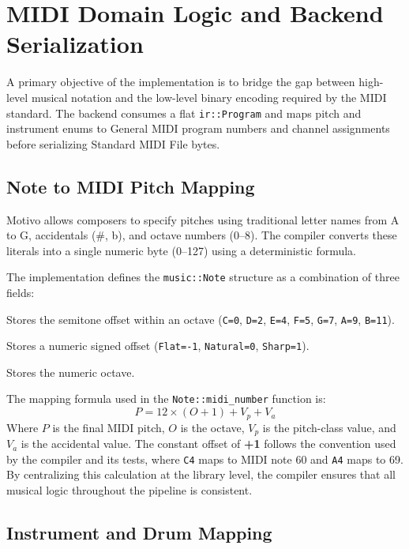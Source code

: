 \section{MIDI Domain Logic and Backend Serialization}\label{sec:midi-backend-design}

A primary objective of the implementation is to bridge the gap between high-level musical notation and the low-level
binary encoding required by the MIDI standard.
The backend consumes a flat \texttt{ir::Program} and maps pitch and instrument enums to General MIDI program numbers and
channel assignments before serializing Standard MIDI File bytes.

\subsection{Note to MIDI Pitch Mapping}\label{detail-subsec:note-to-midi-pitch-mapping}

Motivo allows composers to specify pitches using traditional letter names from A to G, accidentals (\#, b), and
octave numbers
(0--8).
The compiler converts these literals into a single numeric byte (0--127) using a deterministic formula.

The implementation defines the \texttt{music::Note} structure as a combination of three fields:

 Stores the semitone offset within an octave (\texttt{C=0}, \texttt{D=2},
\texttt{E=4}, \texttt{F=5}, \texttt{G=7}, \texttt{A=9}, \texttt{B=11}).

 Stores a numeric signed offset (\texttt{Flat=-1}, \texttt{Natural=0},
\texttt{Sharp=1}).

 Stores the numeric octave.

The mapping formula used in the \texttt{Note::midi\_number} function is:
\begin{equation}
  P = 12 \times (O + 1) + V_p + V_a\label{eq:midi-pitch-detail}
\end{equation}
Where $P$ is the final MIDI pitch, $O$ is the octave, $V_p$ is the pitch-class value, and $V_a$ is the accidental value.
The constant offset of \textbf{+1} follows the convention used by the compiler and its tests, where \texttt{C4} maps to
MIDI note 60 and \texttt{A4} maps to 69.
By centralizing this calculation at the library level, the compiler ensures that all musical logic throughout the
pipeline is consistent.

\subsection{Instrument and Drum Mapping}\label{detail-subsec:instrument-and-drum-mapping}

